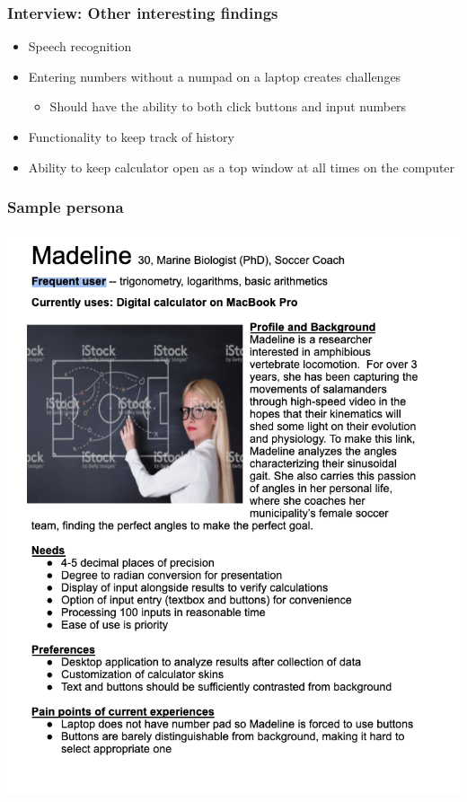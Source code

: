 \documentclass{beamer}
\begin{document}
\begin{frame}
\frametitle{Interview: Other interesting findings}
\begin{itemize}
 \item Speech recognition
 \item Entering numbers without a numpad on a laptop creates challenges
     \begin{itemize}
   \item Should have the ability to both click buttons and input numbers
  \end{itemize}
 \item Functionality to keep track of history
 \item Ability to keep calculator open as a top window at all times on the computer
\end{itemize}
\end{frame}

\begin{frame}
\frametitle{Sample persona}
\begin{center}
  \includegraphics[scale=0.5]{Persona}
\end{center}
\end{frame}
\end{document}
